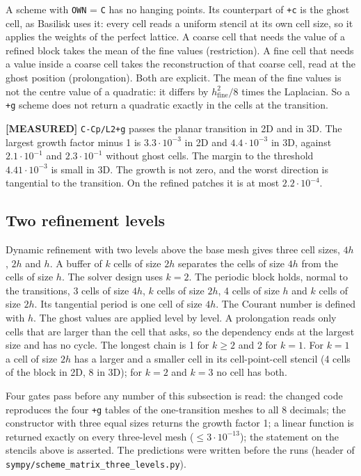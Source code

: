 \documentclass[11pt,a4paper]{article}
\newcommand{\measured}{\textcolor{green!35!black}{\textbf{[MEASURED]}}}
\begin{document}
A scheme with \texttt{OWN} = \texttt{C} has no hanging points. Its counterpart of
\texttt{+c} is the ghost cell, as Basilisk uses it: every cell reads a uniform stencil at
its own cell size, so it applies the weights of the perfect lattice. A coarse cell that
needs the value of a refined block takes the mean of the fine values (restriction). A
fine cell that needs a value inside a coarse cell takes the reconstruction of that coarse
cell, read at the ghost position (prolongation). Both are explicit. The mean of the fine
values is not the centre value of a quadratic: it differs by $h_\text{fine}^2/8$ times
the Laplacian. So a \texttt{+g} scheme does not return a quadratic exactly in the cells
at the transition.

\measured{} \texttt{C-Cp/L2+g} passes the planar transition in 2D and in 3D. The largest
growth factor minus 1 is $3.3\cdot10^{-3}$ in 2D and $4.4\cdot10^{-3}$ in 3D, against
$2.1\cdot10^{-1}$ and $2.3\cdot10^{-1}$ without ghost cells. The margin to the threshold
$4.41\cdot10^{-3}$ is small in 3D. The growth is not zero, and the worst direction is
tangential to the transition. On the refined patches it is at most $2.2\cdot10^{-4}$.

\subsection{Two refinement levels}
\label{sec:threelevels}

Dynamic refinement with two levels above the base mesh gives three cell sizes, $4h$, $2h$
and $h$. A buffer of $k$ cells of size $2h$ separates the cells of size $4h$ from the cells
of size $h$. The solver design uses $k=2$. The periodic block holds, normal to the
transitions, 3 cells of size $4h$, $k$ cells of size $2h$, 4 cells of size $h$ and $k$
cells of size $2h$. Its tangential period is one cell of size $4h$. The Courant number is
defined with $h$. The ghost values are applied level by level. A prolongation reads only
cells that are larger than the cell that asks, so the dependency ends at the largest size
and has no cycle. The longest chain is 1 for $k\ge2$ and 2 for $k=1$. For $k=1$ a cell of
size $2h$ has a larger and a smaller cell in its cell-point-cell stencil (4 cells of the
block in 2D, 8 in 3D); for $k=2$ and $k=3$ no cell has both.

Four gates pass before any number of this subsection is read: the changed code reproduces
the four \texttt{+g} tables of the one-transition meshes to all 8 decimals; the constructor
with three equal sizes returns the growth factor 1; a linear function is returned exactly
on every three-level mesh ($\le 3\cdot10^{-13}$); the statement on the stencils above is
asserted. The predictions were written before the runs (header of
\texttt{sympy/scheme\_matrix\_three\_levels.py}).
\end{document}
